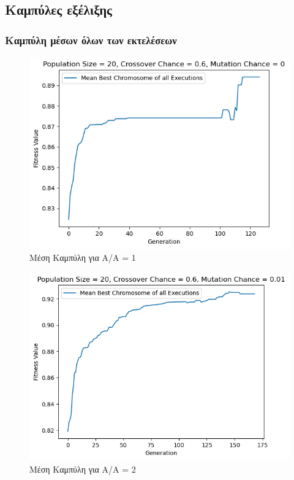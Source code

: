 \documentclass[12pt,a4paper]{article}
\begin{document}
\subsection{Καμπύλες εξέλιξης}

\subsubsection{Καμπύλη μέσων όλων των εκτελέσεων}
\begin{figure}[H]
	\includegraphics[width=\textwidth]{Screenshots/1. Means for AA = 1.png}
	\caption{Μέση Καμπύλη για A/A = 1}
\end{figure}

\begin{figure}[H]
	\includegraphics[width=\textwidth]{Screenshots/3. Means for AA = 2.png}
	\caption{Μέση Καμπύλη για A/A = 2}
\end{figure}
\end{document}
